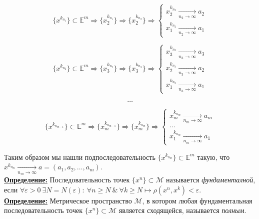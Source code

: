 \documentclass[a4paper,12pt]{article} %
\begin{document}
\begin{equation*}
    \{x^{k_{n_1}} \} \subset \mathbb{E}^m \Rightarrow \{x_2^{k_{n_1}} \} \Rightarrow \{x_2^{k_{n_2}} \} \Rightarrow 
    \begin{cases}
        x_2^{k_{n_2}} \xrightarrow[n_2 \to \infty]{} a_2\\
        x_1^{k_{n_2}} \xrightarrow[n_2 \to \infty]{} a_1
    \end{cases}    
\end{equation*}

\begin{equation*}
    \{x^{k_{n_2}} \} \subset \mathbb{E}^m \Rightarrow \{x_3^{k_{n_2}} \} \Rightarrow \{x_3^{k_{n_3}} \} \Rightarrow 
    \begin{cases}
        x_3^{k_{n_3}} \xrightarrow[n_3 \to \infty]{} a_3\\
        x_2^{k_{n_3}} \xrightarrow[n_3 \to \infty]{} a_2\\
        x_1^{k_{n_3}} \xrightarrow[n_3 \to \infty]{} a_1
    \end{cases}    
\end{equation*}

\[ \dots \]

\begin{equation*}
    \{x^{k_{n_{m-1}}} \} \subset \mathbb{E}^m \Rightarrow \{x_m^{k_{n_{m-1}}} \} \Rightarrow \{x_m^{k_{n_m}} \} \Rightarrow 
    \begin{cases}
        x_m^{k_{n_m}} \xrightarrow[n_m \to \infty]{} a_m\\
        \dots \\
        x_1^{k_{n_m}} \xrightarrow[n_m \to \infty]{} a_1
    \end{cases}    
\end{equation*}

Таким образом мы нашли подпоследовательность $\{x^{k_{n_m}} \} \subset \mathbb{E}^m$ такую, что $x^{k_{n_m}} \xrightarrow[n_m \to \infty]{} a = (a_1, a_2, \dots, a_m)$.\\

\underline{\textbf{Определение:}} Последовательность точек $\{x^n \} \subset \mathscr{M}$ называется \textit{фундаменталной}, если $\forall \varepsilon > 0 ~ \exists N = N(\varepsilon) : ~ \forall n \geqslant N ~ \& ~ \forall k \geqslant N \mapsto \rho(x^n, x^k) < \varepsilon$.\\

\underline{\textbf{Определение:}} Метрическое пространство $\mathscr{M}$, в котором любая фундаментальная последовательность точек $\{x^n \} \subset \mathscr{M}$ является сходящейся, называется \textit{полным}.\\
\end{document}
